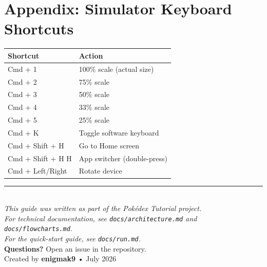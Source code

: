 \documentclass[11pt,a4paper]{article}
\begin{document}
\section*{Appendix: Simulator Keyboard Shortcuts}

\begin{center}
\begin{tabular}{ll}
\toprule
\textbf{Shortcut} & \textbf{Action} \\
\midrule
Cmd + 1 & 100\% scale (actual size) \\
Cmd + 2 & 75\% scale \\
Cmd + 3 & 50\% scale \\
Cmd + 4 & 33\% scale \\
Cmd + 5 & 25\% scale \\
Cmd + K & Toggle software keyboard \\
Cmd + Shift + H & Go to Home screen \\
Cmd + Shift + H H & App switcher (double-press) \\
Cmd + Left/Right & Rotate device \\
\bottomrule
\end{tabular}
\end{center}

\vfill
\begin{center}
\rule{0.5\textwidth}{0.4pt}\\[8pt]
{\small
\textit{This guide was written as part of the Pok\'{e}dex Tutorial project.}\\
\textit{For technical documentation, see \texttt{docs/architecture.md} and \texttt{docs/flowcharts.md}.}\\
\textit{For the quick-start guide, see \texttt{docs/run.md}.}\\[4pt]
\textbf{Questions?} Open an issue in the repository.\\[4pt]
Created by \textbf{enigmak9} • July 2026
}
\end{center}
\end{document}
